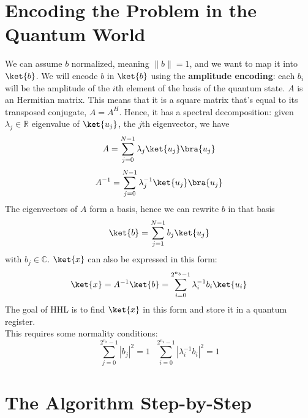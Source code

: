\documentclass[10pt]{article}
\begin{document}
\section{Encoding the Problem in the Quantum World}
We can assume $b$ normalized, meaning $\|b\|=1$, and we want to map it into $\ket{b}$. We will encode $b$ in $\ket{b}$ using the \textbf{amplitude encoding}: each $b_i$ will be the amplitude of the $i$th element of the basis of the quantum state.
$A$ is an Hermitian matrix. This means that it is a square matrix that's equal to its transposed conjugate, $A=A^H$. Hence, it has a spectral decomposition: given $\lambda_j\in\mathbb{R}$ eigenvalue of $\ket{u_j}$, the $j$th eigenvector, we have 
$$A=\sum_{j=0}^{N-1} \lambda_j\ket{u_j}\bra{u_j}$$
$$A^{-1} = \sum_{j=0}^{N-1}\lambda_j^{-1}\ket{u_j}\bra{u_j}$$
The eigenvectors of $A$ form a basis, hence we can rewrite $b$ in that basis
$$\ket{b} = \sum_{j=1}^{N-1}b_j\ket{u_j}$$
with $b_j\in\mathbb{C}$. $\ket{x}$ can also be expressed in this form:
$$\ket{x}=A^{-1}\ket{b}=\sum_{i=0}^{2^{n_b}-1}\lambda_i^{-1}b_i\ket{u_i}$$
The goal of HHL is to find $\ket{x}$ in this form and store it in a quantum register.\\
This requires some normality conditions:
$$\sum_{j=0}^{2^{n_b}-1}|b_j|^2=1\:\:\:\sum_{i=0}^{2^{n_b}-1}|\lambda_i^{-1}b_i|^2=1$$
\section{The Algorithm Step-by-Step}
\end{document}
